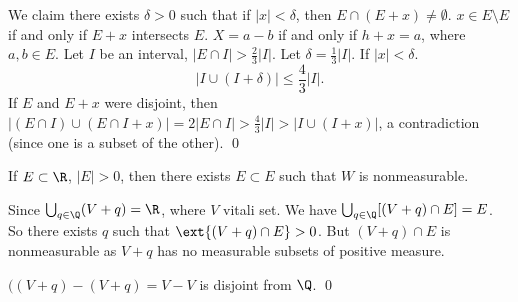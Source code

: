 
\pf We claim there exists $\delta>0$ such that if $|x|<\delta$, then $E \cap (E+x) \neq \emptyset$. $x \in E \setminus E$ if and only if $E+x$ intersects $E$. $X= a-b$ if and only if $h+x=a$, where $a,b \in E$. Let $I$ be an interval, $|E \cap I|> \frac{2}{3} |I|$. Let $\delta= \frac{1}{3} |I|$. If $|x|<\delta$.
	\[
	|I \cup (I+\delta)| \leq \frac{4}{3} |I|. 
	\]
If $E$ and $E+x$ were disjoint, then $| (E \cap I) \cup (E \cap I +x)|= 2|E \cap I|> \frac{4}{3} |I|> |I \cup (I+x)|$, a contradiction (since one is a subset of the other). \qed \\



\begin{thm}
If $E \subset \R$, $|E|>0$, then there exists $E \subset E$ such that $W$ is nonmeasurable. 
\end{thm}

\pf Since $\bigcup_{q \in \Q} (V+q)=\R$, where $V$ vitali set. We have $\bigcup_{q \in \Q} [(V+q) \cap E]=E$. So there exists $q$ such that $\ext{(V+q) \cap E} >0$. But $(V+q) \cap E$ is nonmeasurable as $V+q$ has no measurable subsets of positive measure. 

$((V+q)-(V+q)= V-V$ is disjoint from $\Q$. \qed \\
































